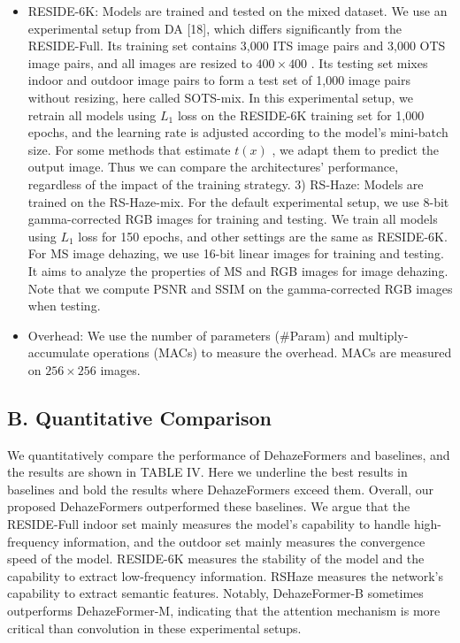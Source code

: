 \documentclass{article}
\begin{document}
\begin{itemize}
\item RESIDE-6K: Models are trained and tested on the mixed dataset. We use an experimental setup from DA [18], which differs significantly from the RESIDE-Full. Its training set contains 3,000 ITS image pairs and 3,000 OTS image pairs, and all images are resized to $400\times400$ . Its testing set mixes indoor and outdoor image pairs to form a test set of 1,000 image pairs without resizing, here called SOTS-mix. In this experimental setup, we retrain all models using $L_{1}$ loss on the RESIDE-6K training set for 1,000 epochs, and the learning rate is adjusted according to the model’s mini-batch size. For some methods that estimate $t(x)$ , we adapt them to predict the output image. Thus we can compare the architectures’ performance, regardless of the impact of the training strategy. 3) RS-Haze: Models are trained on the RS-Haze-mix. For the default experimental setup, we use 8-bit gamma-corrected RGB images for training and testing. We train all models using $L_{1}$ loss for 150 epochs, and other settings are the same as RESIDE-6K. For MS image dehazing, we use 16-bit linear images for training and testing. It aims to analyze the properties of MS and RGB images for image dehazing. Note that we compute PSNR and SSIM on the gamma-corrected RGB images when testing.


\item Overhead: We use the number of parameters (#Param) and multiply-accumulate operations (MACs) to measure the overhead. MACs are measured on $256\times256$ images.


\end{itemize}

\subsection{B. Quantitative Comparison}


We quantitatively compare the performance of DehazeFormers and baselines, and the results are shown in TABLE IV. Here we underline the best results in baselines and bold the results where DehazeFormers exceed them. Overall, our proposed DehazeFormers outperformed these baselines. We argue that the RESIDE-Full indoor set mainly measures the model’s capability to handle high-frequency information, and the outdoor set mainly measures the convergence speed of the model. RESIDE-6K measures the stability of the model and the capability to extract low-frequency information. RSHaze measures the network’s capability to extract semantic features. Notably, DehazeFormer-B sometimes outperforms DehazeFormer-M, indicating that the attention mechanism is more critical than convolution in these experimental setups.
\end{document}
